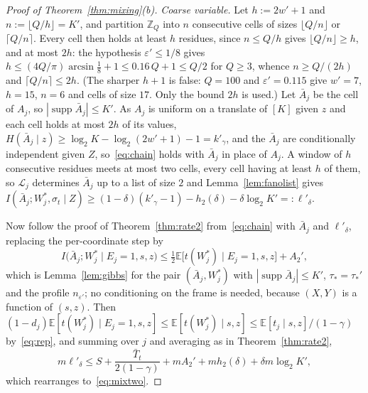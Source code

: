 \documentclass[aps,prx,twocolumn,superscriptaddress,nofootinbib,longbibliography]{revtex4-2}
\theoremstyle{plain}
\theoremstyle{definition}
\theoremstyle{remark}
\newcommand{\E}{\mathbb{E}}
\newcommand{\Z}{\mathbb{Z}}
\newcommand{\supp}{\operatorname{supp}}
\begin{document}
\begin{proof}[Proof of Theorem~\ref{thm:mixing}(b)]
\emph{Coarse variable.} Let $h:=2w'+1$ and $n:=\lfloor Q/h\rfloor=K'$, and partition $\Z_Q$ into $n$ consecutive cells of sizes $\lfloor Q/n\rfloor$ or $\lceil Q/n\rceil$. Every cell then holds at least $h$ residues, since $n\le Q/h$ gives $\lfloor Q/n\rfloor\ge h$, and at most $2h$: the hypothesis $\varepsilon'\le1/8$ gives $h\le(4Q/\pi)\arcsin\tfrac18+1\le0.16\,Q+1\le Q/2$ for $Q\ge3$, whence $n\ge Q/(2h)$ and $\lceil Q/n\rceil\le2h$. (The sharper $h+1$ is false: $Q=100$ and $\varepsilon'=0.115$ give $w'=7$, $h=15$, $n=6$ and cells of size $17$. Only the bound $2h$ is used.) Let $\bar A_j$ be the cell of $A_j$, so $|\supp\bar A_j|\le K'$. As $A_j$ is uniform on a translate of $[K]$ given $z$ and each cell holds at most $2h$ of its values, $H(\bar A_j\mid z)\ge\log_2K-\log_2(2w'+1)-1=k'_\gamma$, and the $\bar A_j$ are conditionally independent given $Z$, so~\eqref{eq:chain} holds with $\bar A_j$ in place of $A_j$. A window of $h$ consecutive residues meets at most two cells, every cell having at least $h$ of them, so $\mathcal L_j$ determines $\bar A_j$ up to a list of size $2$ and Lemma~\ref{lem:fanolist} gives $I(\bar A_j;W^*_j,\sigma_t\mid Z)\ge(1-\delta)(k'_\gamma-1)-h_2(\delta)-\delta\log_2K'=:\ell'_\delta$.

Now follow the proof of Theorem~\ref{thm:rate2} from~\eqref{eq:chain} with $\bar A_j$ and $\ell'_\delta$, replacing the per-coordinate step by
\[
I\big(\bar A_j;W^*_j\mid E_j=1,s,z\big)\le\tfrac12\E\big[t(W^*_j)\mid E_j=1,s,z\big]+A_2',
\]
which is Lemma~\ref{lem:gibbs} for the pair $(\bar A_j,W^*_j)$ with $|\supp\bar A_j|\le K'$, $\tau_*=\tau_*'$ and the profile $n_{\varepsilon'}$; no conditioning on the frame is needed, because $(X,Y)$ is a function of $(s,z)$. Then $(1-d_j)\E[t(W^*_j)\mid E_j=1,s,z]\le\E[t(W^*_j)\mid s,z]\le\E[t_j\mid s,z]/(1-\gamma)$ by~\eqref{eq:rep}, and summing over $j$ and averaging as in Theorem~\ref{thm:rate2},
\[
m\ell'_\delta\le S+\frac{\bar T_t}{2(1-\gamma)}+mA_2'+mh_2(\delta)+\delta m\log_2K',
\]
which rearranges to~\eqref{eq:mixtwo}.
\end{proof}
\end{document}
